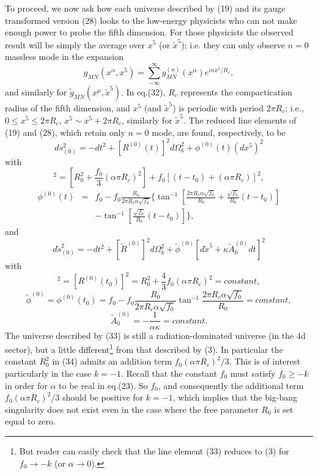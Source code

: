 \documentclass[a4paper,12pt]{article}
\begin{document}
To proceed, we now ask how each universe described by (19) and its
gauge transformed version (28) looks to the low-energy physicists
who can not make enough power to probe the fifth dimension. For
those physicists the observed result will be simply the average
over $x^5$ (or $\tilde{x}^5$); i.e. they can only observe $n=0$
massless mode in the expansion
\begin{equation}
g_{MN}(x^{\alpha},x^5) =\sum_{-\infty}^{\infty}
g^{(n)}_{MN}(x^{\alpha})e^{inx^5/R_{c}}  ,
\end{equation}
and similarly for $\tilde{g}_{MN}(x^{\mu},\tilde{x}^5)$. In
eq.(32), $R_{c}$ represents the compactication radius of the fifth
dimension, and $x^5$ (and $\tilde{x}^5$) is periodic with period
$2\pi R_{c}$; i.e., $0 \leq x^5 \leq 2\pi R_{c}$, $x^5 \sim x^5
+2\pi R_{c}$, similarly for $\tilde{x}^5$. The reduced line
elements of (19) and (28), which retain only $n=0$ mode, are
found, respectively, to be
\begin{equation}
ds^2_{(0)}=-dt^2 + [R^{(0)} (t)]^2d\Omega^2_{k} +
\phi^{(0)}(t)(dx^5)^2
\end{equation}
with
\begin{equation}
[R^{(0)}(t)]^2=[R^2_0 +\frac{f_0}{3}(\alpha \pi R_c)^2]
+f_0[(t-t_0) + (\alpha \pi R_c)]^2 ,
\end{equation}
\begin{eqnarray}
\phi^{(0)}(t)& =& f_0 -f_0 \frac{R_0}{2\pi R_c \alpha \sqrt{f_0}}
\{\tan^{-1}[\frac{2\pi R_c \alpha \sqrt{f_0}}{R_0} +
\frac{\sqrt{f_0}}{R_0}(t-t_0)] \nonumber \\
 & &-\tan^{-1}[\frac{\sqrt{f_0}}{R_0}(t-t_0)]\} ,
\end{eqnarray}
and
\begin{equation}
d\tilde{s}^2_{(0)} =-dt^2 +[\tilde{R}^{(0)}]^2d\Omega^2_{k} +
\tilde{\phi}^{(0)}[d\tilde{x}^5 + \kappa \tilde{A}^{(0)}_0dt]^2
\end{equation}
with
\begin{equation}
[\tilde{R}^{(0)}]^2 =[R^{(0)}(t_0)]^2 =R^2_0 +
\frac{4}{3}f_0(\alpha \pi R_c)^2 =constant ,
\end{equation}
\begin{equation}
\tilde{\phi}^{(0)} =\phi^{(0)}(t_0) =f_0-f_0\frac{R_0}{2\pi R_c
\alpha \sqrt{f_0}}\tan^{-1} \frac{2 \pi R_c \alpha
\sqrt{f_0}}{R_0} = constant,
\end{equation}
\begin{equation}
\tilde{A}^{(0)}_0 = -\frac{1}{\alpha \kappa } = constant .
\end{equation}
The universe described by (33) is still a radiation-dominated
universe (in the 4d sector), but a little different\footnote{But
reader can easily check that the line element (33) reduces to (3)
for $f_0 \rightarrow -k$ (or $\alpha \rightarrow 0$).} from that
described by (3). In particular the constant $R^2_0$ in (34)
admits an addition term $f_0(\alpha \pi R_c)^2/3$. This is of
interest particularly in the case $k=-1$. Recall that the constant
$f_0$ must satisfy $f_0\geq -k$ in order for $\alpha$ to be real
in eq.(23). So $f_0$, and consequently the additional term
$f_0(\alpha \pi R_c)^2/3$ should be positive for $k=-1$, which
implies that the big-bang singularity does not exist even in the
case where the free parameter $R_0$ is set equal to zero.
\end{document}
